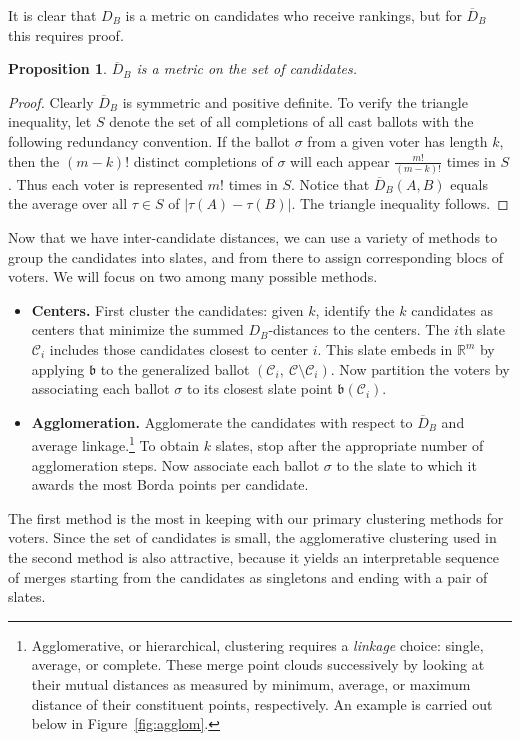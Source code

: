 \documentclass{amsart}
\newcommand{\R}{\mathbb{R}}
\newcommand{\C}{\mathcal{C}}
\newcommand{\dcand}{D_B}
\newcommand{\dcandbar}{\overline{D}_B}
\newcommand{\bb}{\mathfrak{b}}
\theoremstyle{plain}
\newtheorem{proposition}[theorem]{Proposition}
\theoremstyle{definition}
\theoremstyle{remark}
\begin{document}
It is clear that $\dcand$ is a metric on candidates who receive rankings, but for $\dcandbar$ this requires proof.

\begin{proposition}$\dcandbar$ is a metric on the set of candidates.
\end{proposition} 

\begin{proof} 
Clearly $\dcandbar$ is symmetric and positive definite.  To verify the triangle inequality, let $S$ denote the set of all completions of all cast ballots with the following redundancy convention.  If the ballot $\sigma$ from a given voter has length $k$, then the $(m-k)!$ distinct completions of $\sigma$ will each appear $\frac{m!}{(m-k)!}$ times in $S$. Thus each voter is represented  $m!$ times in $S$.  Notice that $\dcandbar(A,B)$ equals the average over all $\tau\in S$ of $|\tau(A)-\tau(B)|$. The triangle inequality follows.
\end{proof}

Now that we have inter-candidate distances, we can use a variety of methods to group the candidates into slates, and from there to assign corresponding blocs of voters.  We will focus on two among many possible methods.
\begin{itemize}
\item {\bf Centers.}
First cluster the candidates:  given $k$, identify the $k$ candidates as centers that minimize the summed  $\dcand$-distances to the centers.  The $i$th slate $\C_i$ includes those candidates closest to center $i$.  This slate embeds in $\R^m$ by applying $\bb$ to the generalized ballot $(\C_i, \ \C\setminus \C_i)$.  Now partition the voters by associating each ballot $\sigma$ to its closest slate point $\bb(\C_i)$.
    \item {\bf Agglomeration.} Agglomerate the candidates with respect to $\dcandbar$ and average linkage.\footnote{Agglomerative, or hierarchical, clustering requires a {\em linkage} choice: single, average, or complete. These merge point clouds successively by looking at their mutual distances as measured by minimum, average, or maximum distance of their constituent points, respectively. An example is carried out below in Figure~\ref{fig:agglom}.}  To obtain $k$ slates, stop after the appropriate number of agglomeration steps.  Now associate each ballot $\sigma$ to the slate to which it awards the most Borda points per candidate.
\end{itemize}
The first method is the most in keeping with our primary clustering methods for voters.  Since the set of candidates is small, the agglomerative clustering used in the second method is also attractive, because it yields an interpretable sequence of merges starting from the candidates as singletons and ending with a pair of slates.  
\end{document}
